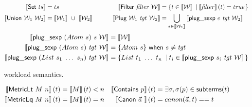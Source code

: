 \documentclass{article}
\begin{document}
\begin{figure}%
  \begin{align*}
    \denote{ \mathsf{Set} ~ ts } &= ts
    & %
    \denote{ \mathsf{Filter} ~ \mathit{filter} ~ \W } &=
    \set{t \in \denote{ \W }}{\denote{ \mathit{filter} } (t) = true}
    \\
    \denote{ \mathsf{Union} ~ \W_1 ~ \W_2 } &=
    \denote{ \W_1 }~\cup~\denote{ \W_2 } \hspace{8mm}
    & %
    \denote{ \mathsf{Plug} ~ \W_1 ~ \mathit{tgt} ~ \W_2 } &=
      \bigcup_{e \in \denote{\W_1}}
      \denote{ \plugsexp ~ e ~ \mathit{tgt} ~ \W_2 }
  \end{align*}
  \begin{align*}
    \left\llbracket  \mathsf{plug\_sexp} ~ (Atom ~ s) ~ \mathit{s} ~ \mathcal{W}  \right\rrbracket &=
    \left\llbracket  \mathcal{W}  \right\rrbracket
    \\
    \left\llbracket  \mathsf{plug\_sexp} ~ (Atom ~ s) ~ \mathit{tgt} ~ \mathcal{W}  \right\rrbracket &=
    \{Atom ~ s\} ~\mathsf{when} ~ s \neq \mathit{tgt}
    \\
    \left\llbracket  \mathsf{plug\_sexp} ~ (List ~ s_1 ~ \ldots ~ s_n) ~ \mathit{tgt} ~ \mathcal{W}  \right\rrbracket &=
    \left\{List ~ t_1 ~ \ldots ~ t_n \hspace{3pt} \left\vert \hspace{3pt} t_i \in \left\llbracket  \mathsf{plug\_sexp} ~ s_i ~ \mathit{tgt} ~ \mathcal{W}  \right\rrbracket \right.\right\}
  \end{align*}
  \caption{\enumo workload semantics.}
  \label{fig:denote-workload}
\end{figure}

\begin{figure}%
  \begin{align*}
    \left\llbracket \mathsf{MetricLt} ~ M ~ n \right\rrbracket(t) &= \left\llbracket  M  \right\rrbracket (t) < n  &
    \left\llbracket \mathsf{Contains} ~ p \right\rrbracket(t) &=
      \exists \sigma, \sigma(p) \in \mathsf{subterms}(t) \\
    \left\llbracket \mathsf{MetricEq} ~ M ~ n \right\rrbracket(t) &= \left\llbracket  M  \right\rrbracket (t) = n  &
    \left\llbracket \mathsf{Canon} ~ \vec{a} ~  \right\rrbracket(t) &= canon(\vec{a}, t) == t
  \end{align*}
\end{figure}
\end{document}
